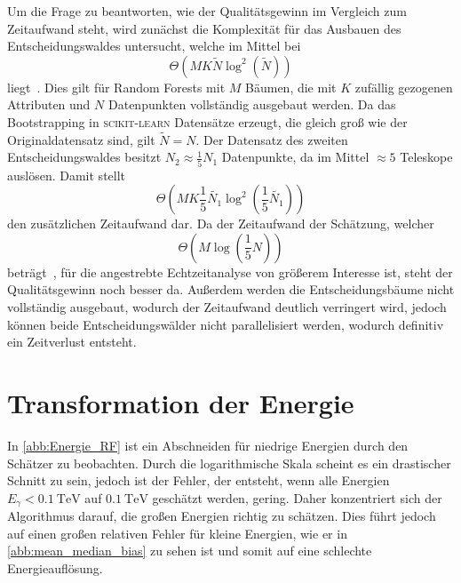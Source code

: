 Um die Frage zu beantworten, wie der Qualitätsgewinn im Vergleich zum Zeitaufwand steht, wird zunächst die Komplexität für das Ausbauen des Entscheidungswaldes untersucht,
welche im Mittel bei
\begin{equation}
  \Theta (MK\tilde{N} \log^2\left(\tilde{N}\right))
\end{equation}
liegt~\cite[96]{understanding_RF}.
Dies gilt für Random Forests mit $M$ Bäumen, die mit $K$ zufällig gezogenen Attributen und $N$ Datenpunkten vollständig ausgebaut werden.
Da das Bootstrapping in \textsc{scikit-learn} Datensätze erzeugt, die gleich groß wie der Originaldatensatz sind, gilt $\tilde{N}= N$.
Der Datensatz des zweiten Entscheidungswaldes besitzt $N_2 \approx \frac{1}{5}N_1$ Datenpunkte, da im Mittel $\approx 5$ Teleskope auslösen.
Damit stellt
\begin{equation}
  \Theta \left(MK\frac{1}{5}\tilde{N_1} \log^2\left(\frac{1}{5}\tilde{N_1}\right)\right)
\end{equation}
den zusätzlichen Zeitaufwand dar.
Da der Zeitaufwand der Schätzung, welcher
\begin{equation}
  \Theta\left(M\log\left(\frac{1}{5}N\right)\right)
\end{equation}
beträgt~\cite[98]{understanding_RF}, für die angestrebte Echtzeitanalyse von größerem Interesse ist, steht der Qualitätsgewinn noch besser da.
Außerdem werden die Entscheidungsbäume nicht vollständig ausgebaut, wodurch der Zeitaufwand deutlich verringert wird, jedoch können beide Entscheidungswälder nicht
parallelisiert werden, wodurch definitiv ein Zeitverlust entsteht.

\section{Transformation der Energie}

In \autoref{abb:Energie_RF} ist ein Abschneiden für niedrige Energien durch den Schätzer zu beobachten.
Durch die logarithmische Skala scheint es ein drastischer Schnitt zu sein, jedoch ist der Fehler, der entsteht, wenn alle Energien $E_\gamma < \SI{0.1}{\tera\eV}$
auf $\SI{0.1}{\tera\eV}$ geschätzt werden, gering.
Daher konzentriert sich der Algorithmus darauf, die großen Energien richtig zu schätzen.
Dies führt jedoch auf einen großen relativen Fehler für kleine Energien, wie er in \autoref{abb:mean_median_bias} zu sehen ist und somit auf eine schlechte
Energieauflösung.

